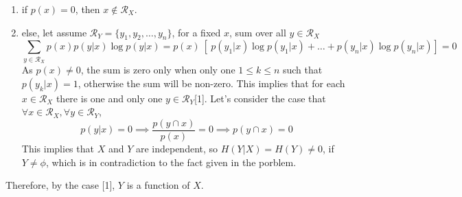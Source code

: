 \documentclass[12pt]{assignment}
\newcommand{\rangeX}{\mathcal{R}_X}
\newcommand{\rangeY}{\mathcal{R}_Y}
\newcommand{\mpipe}{|}
\begin{document}
{    %
    \begin{enumerate}
        \item if $p(x)=0$, then $x \not\in \rangeX$.
		\item else, let assume $\rangeY=\{y_1, y_2,\ldots,y_n\}$,\newpar
			for a fixed $x$, sum over all $y\in \rangeX$
			$$\sum_{y\in\rangeX}p(x)p(y \mpipe x)\log p(y \mpipe x) = p(x)\ [\ p(y_1 \mpipe x)\log p(y_1 \mpipe x) + \ldots + p(y_n \mpipe x)\log p(y_n \mpipe x)] = 0$$
			As $p(x) \not= 0$, the sum is zero only when only one $1 \leq k \leq n$ such that $p(y_k \mpipe x)=1$, otherwise the sum will be non-zero.
			This implies that for each $x\in\rangeX$ there is one and only one $y\in\rangeY$[1].
			\newpar
			Let's consider the case that $\forall x\in\rangeX, \forall y\in\rangeY$,
			$$ p(y \mpipe x)=0 \implies \frac{p(y \cap x)}{p(x)} = 0 \implies p(y \cap x)=0$$
			This implies that $X$ and $Y$ are independent, so $H(Y \mpipe X) = H(Y) \not= 0$, if $Y \not= \phi$, which is in contradiction to the fact given in the porblem.
    \end{enumerate}

	Therefore, by the case [1], $Y$ is a function of $X$.

}
\end{document}
